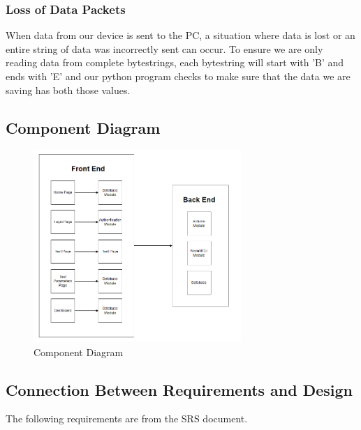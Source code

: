 \documentclass[12pt, titlepage]{article}
\begin{document}
\subsubsection{Loss of Data Packets}
When data from our device is sent to the PC, a situation where data is lost or an entire string of data was incorrectly sent can occur. To ensure we are only reading data from complete bytestrings, each bytestring will start with 'B' and ends with 'E' and our python program checks to make sure that the data we are saving has both those values.


\newpage
\subsection{Component Diagram}
\begin{figure}[hbt!]
  \begin{center}
  \includegraphics[width=0.7\textwidth]{component_diagram.png}
  \caption{Component Diagram} 
  \end{center}
  \end{figure}

\newpage
\subsection{Connection Between Requirements and Design} \label{SecConnection}
The following requirements are from the SRS document.
\end{document}
